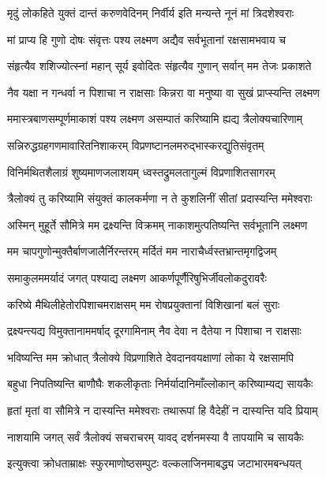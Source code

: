\twolineshloka
{मृदुं लोकहिते युक्तं दान्तं करुणवेदिनम्}
{निर्वीर्य इति मन्यन्ते नूनं मां त्रिदशेश्वराः} %

\twolineshloka
{मां प्राप्य हि गुणो दोषः संवृत्तः पश्य लक्ष्मण}
{अद्यैव सर्वभूतानां रक्षसामभवाय च} %

\twolineshloka
{संहृत्यैव शशिज्योत्स्नां महान् सूर्य इवोदितः}
{संहृत्यैव गुणान् सर्वान् मम तेजः प्रकाशते} %

\twolineshloka
{नैव यक्षा न गन्धर्वा न पिशाचा न राक्षसाः}
{किन्नरा वा मनुष्या वा सुखं प्राप्स्यन्ति लक्ष्मण} %

\twolineshloka
{ममास्त्रबाणसम्पूर्णमाकाशं पश्य लक्ष्मण}
{असम्पातं करिष्यामि ह्यद्य त्रैलोक्यचारिणाम्} %

\twolineshloka
{सन्निरुद्धग्रहगणमावारितनिशाकरम्}
{विप्रणष्टानलमरुद्भास्करद्युतिसंवृतम्} %

\twolineshloka
{विनिर्मथितशैलाग्रं शुष्यमाणजलाशयम्}
{ध्वस्तद्रुमलतागुल्मं विप्रणाशितसागरम्} %

\twolineshloka
{त्रैलोक्यं तु करिष्यामि संयुक्तं कालकर्मणा}
{न ते कुशलिनीं सीतां प्रदास्यन्ति ममेश्वराः} %

\twolineshloka
{अस्मिन् मुहूर्ते सौमित्रे मम द्रक्ष्यन्ति विक्रमम्}
{नाकाशमुत्पतिष्यन्ति सर्वभूतानि लक्ष्मण} %

\twolineshloka
{मम चापगुणोन्मुक्तैर्बाणजालैर्निरन्तरम्}
{मर्दितं मम नाराचैर्ध्वस्तभ्रान्तमृगद्विजम्} %

\twolineshloka
{समाकुलममर्यादं जगत् पश्याद्य लक्ष्मण}
{आकर्णपूर्णैरिषुभिर्जीवलोकदुरावरैः} %

\twolineshloka
{करिष्ये मैथिलीहेतोरपिशाचमराक्षसम्}
{मम रोषप्रयुक्तानां विशिखानां बलं सुराः} %

\twolineshloka
{द्रक्ष्यन्त्यद्य विमुक्तानाममर्षाद् दूरगामिनाम्}
{नैव देवा न दैतेया न पिशाचा न राक्षसाः} %

\twolineshloka
{भविष्यन्ति मम क्रोधात् त्रैलोक्ये विप्रणाशिते}
{देवदानवयक्षाणां लोका ये रक्षसामपि} %

\twolineshloka
{बहुधा निपतिष्यन्ति बाणौघैः शकलीकृताः}
{निर्मर्यादानिमाँल्लोकान् करिष्याम्यद्य सायकैः} %

\twolineshloka
{हृतां मृतां वा सौमित्रे न दास्यन्ति ममेश्वराः}
{तथारूपां हि वैदेहीं न दास्यन्ति यदि प्रियाम्} %

\twolineshloka
{नाशयामि जगत् सर्वं त्रैलोक्यं सचराचरम्}
{यावद् दर्शनमस्या वै तापयामि च सायकैः} %

\twolineshloka
{इत्युक्त्वा क्रोधताम्राक्षः स्फुरमाणोष्ठसम्पुटः}
{वल्कलाजिनमाबद्ध्य जटाभारमबन्धयत्} %

